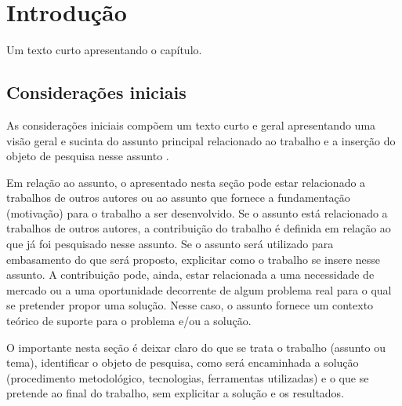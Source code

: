
\chapter{Introdução}\label{cap:introducao}

Um texto curto apresentando o capítulo.


\section{Considerações iniciais}\label{sec:consideracoesIniciais}

As considerações iniciais compõem um texto curto e geral apresentando uma visão geral e sucinta do assunto principal relacionado ao trabalho e a inserção do objeto de pesquisa nesse assunto \cite{Moore:2000:CMC:333067.333074}.

Em relação ao assunto, o apresentado nesta seção pode estar relacionado a trabalhos de outros autores ou ao assunto que fornece a fundamentação (motivação) para o trabalho a ser desenvolvido. Se o assunto está relacionado a trabalhos de outros autores, a contribuição do trabalho é definida em relação ao que já foi pesquisado nesse assunto. Se o assunto será utilizado para embasamento do que será proposto, explicitar como o trabalho se insere nesse assunto. A contribuição pode, ainda, estar relacionada a uma necessidade de mercado ou a uma oportunidade decorrente de algum problema real para o qual se pretender propor uma solução. Nesse caso, o assunto fornece um contexto teórico de suporte para o problema e/ou a solução.

O importante nesta seção é deixar claro do que se trata o trabalho (assunto ou tema), identificar o objeto de pesquisa, como será encaminhada a solução (procedimento metodológico, tecnologias, ferramentas utilizadas) e o que se pretende ao final do trabalho, sem explicitar a solução e os resultados.


